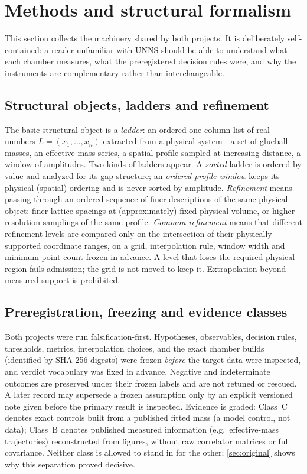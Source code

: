 \documentclass[11pt,a4paper]{article}
\theoremstyle{definition}
\theoremstyle{remark}
\newcommand{\uns}{UNNS}
\begin{document}
\section{Methods and structural formalism}\label{sec:methods}

This section collects the machinery shared by both projects. It is deliberately self-contained: a reader unfamiliar with \uns{} should be able to understand what each chamber measures, what the preregistered decision rules were, and why the instruments are complementary rather than interchangeable.

\subsection{Structural objects, ladders and refinement}
The basic structural object is a \emph{ladder}: an ordered one-column list of real numbers $L=(x_1,\dots,x_n)$ extracted from a physical system---a set of glueball masses, an effective-mass series, a spatial profile sampled at increasing distance, a window of amplitudes. Two kinds of ladders appear. A \emph{sorted} ladder is ordered by value and analyzed for its gap structure; an \emph{ordered profile window} keeps its physical (spatial) ordering and is never sorted by amplitude. \emph{Refinement} means passing through an ordered sequence of finer descriptions of the same physical object: finer lattice spacings at (approximately) fixed physical volume, or higher-resolution samplings of the same profile. \emph{Common refinement} means that different refinement levels are compared only on the intersection of their physically supported coordinate ranges, on a grid, interpolation rule, window width and minimum point count frozen in advance. A level that loses the required physical region fails admission; the grid is not moved to keep it. Extrapolation beyond measured support is prohibited.

\subsection{Preregistration, freezing and evidence classes}
Both projects were run falsification-first. Hypotheses, observables, decision rules, thresholds, metrics, interpolation choices, and the exact chamber builds (identified by SHA-256 digests) were frozen \emph{before} the target data were inspected, and verdict vocabulary was fixed in advance. Negative and indeterminate outcomes are preserved under their frozen labels and are not retuned or rescued. A later record may supersede a frozen assumption only by an explicit versioned note given before the primary result is inspected. Evidence is graded: Class~C denotes exact controls built from a published fitted mass (a model control, not data); Class~B denotes published measured information (e.g.\ effective-mass trajectories) reconstructed from figures, without raw correlator matrices or full covariance. Neither class is allowed to stand in for the other; \cref{sec:original} shows why this separation proved decisive.
\end{document}
